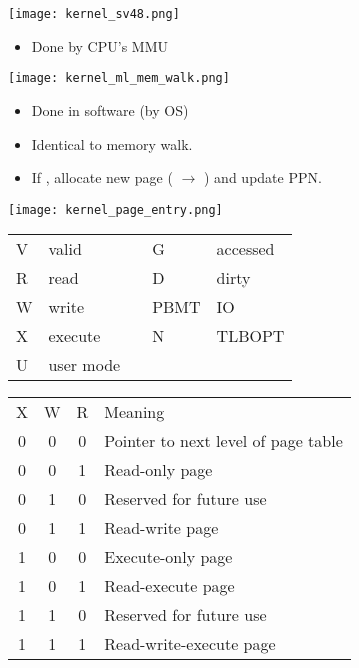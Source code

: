 \begin{center}
    \texttt{[image: kernel\_sv48.png]}
\end{center}

\begin{itemize}
    \item Done by CPU's MMU
\end{itemize}
\begin{center}
    \texttt{[image: kernel\_ml\_mem\_walk.png]}
\end{center}

\newpar{}
\begin{itemize}
    \item Done in software (by OS)
    \item Identical to memory walk.
    \item If , allocate new page ( $\to$ ) and update PPN.\ %
\end{itemize}


\begin{center}
    \texttt{[image: kernel\_page\_entry.png]}
\end{center}

\renewcommand{\arraystretch}{1.3}
\setlength{\oldtabcolsep}{\tabcolsep}\setlength\tabcolsep{6pt}

\begin{tabularx}{\linewidth}{@{}llcll@{}}
    V & valid     &  & G    & accessed \\
    R & read      &  & D    & dirty    \\
    W & write     &  & PBMT & IO       \\
    X & execute   &  & N    & TLBOPT   \\
    U & user mode &  &
\end{tabularx}

\begin{tabularx}{\linewidth}{@{}cccl@{}}
    X & W & R & Meaning                             \\
    \cmidrule{1-4}
    0 & 0 & 0 & Pointer to next level of page table \\
    0 & 0 & 1 & Read-only page                      \\
    0 & 1 & 0 & Reserved for future use             \\
    0 & 1 & 1 & Read-write page                     \\
    1 & 0 & 0 & Execute-only page                   \\
    1 & 0 & 1 & Read-execute page                   \\
    1 & 1 & 0 & Reserved for future use             \\
    1 & 1 & 1 & Read-write-execute page
\end{tabularx}

